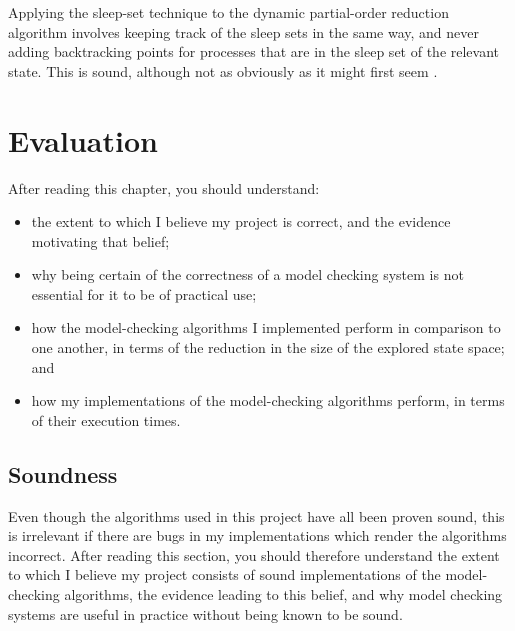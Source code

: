 \documentclass[12pt,a4paper,twoside,openright]{report}
\newenvironment{understandinglist}
	{\begin{itemize} \itemsep 0em}{\end{itemize}}
\begin{document}
Applying the sleep-set technique to the
dynamic partial-order reduction
algorithm involves keeping track of the
sleep sets in the same way, and never
adding backtracking points for
processes that are in the sleep set
of the relevant state. This is
sound, although not as obviously as
it might first seem \cite{flan05addm}.



\chapter{Evaluation}
\label{cha:evaluation}

After reading this chapter,
you should understand:
\begin{understandinglist}
	\item the extent to which I believe
	my project is correct, and the evidence
	motivating that belief;
	\item why being certain of the
	correctness of a model checking
	system is not essential for it
	to be of practical use;
	\item how the model-checking
	algorithms I implemented perform
	in comparison to one another,
	in terms of the reduction in the
	size of the explored state space; and
	\item how my implementations
	of the model-checking algorithms
	perform, in terms of their
	execution times.
\end{understandinglist}

\section{Soundness}

Even though the algorithms
used in this project have all been proven sound,
this is irrelevant if there are bugs in my
implementations which render the algorithms incorrect.
After reading this section, you should
therefore understand the extent to which I believe
my project consists of sound implementations
of the model-checking algorithms, the
evidence leading to this belief, and why
model checking systems are useful in
practice without being known to be
sound.
\end{document}
